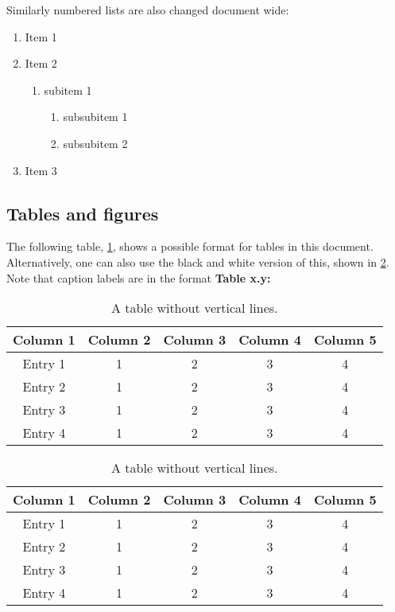 Similarly numbered lists are also changed document wide:

\begin{enumerate}
    \item Item 1
    \item Item 2
    \begin{enumerate}
        \item subitem 1
        \begin{enumerate}
            \item subsubitem 1
            \item subsubitem 2
        \end{enumerate}
    \end{enumerate}
    \item Item 3
\end{enumerate}

\newpage

\subsection{Tables and figures}
The following table, \cref{table: style 1}, shows a possible format for tables in this document. Alternatively, one can also use the black and white version of this, shown in \cref{table: style 2}. Note that caption labels are in the format \textbf{\textcolor{Tue-red}{Table x.y:} }
\begin{table}[ht]
\centering
\caption{A table without vertical lines.}
\begin{tabular}[t]{ccccc}
\toprule
\color{Tue-red}\textbf{Column 1}&\color{Tue-red}\textbf{Column 2}&\color{Tue-red}\textbf{Column 3}&\color{Tue-red}\textbf{Column 4}&\color{Tue-red}\textbf{Column 5}\\
\midrule
Entry 1&1&2&3&4\\
Entry 2&1&2&3&4\\
Entry 3&1&2&3&4\\
Entry 4&1&2&3&4\\
\bottomrule
\end{tabular}
\label{table: style 1}
\end{table}

\begin{table}[ht]
\centering
\caption{A table without vertical lines.}
\begin{tabular}[t]{ccccc}
\toprule
\textbf{Column 1}&\textbf{Column 2}&\textbf{Column 3}&\textbf{Column 4}&\textbf{Column 5}\\
\midrule
Entry 1&1&2&3&4\\
Entry 2&1&2&3&4\\
Entry 3&1&2&3&4\\
Entry 4&1&2&3&4\\
\bottomrule
\end{tabular}
\label{table: style 2}
\end{table}

